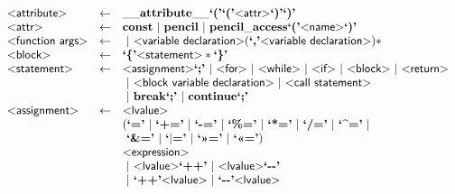 \begin{figure}
\[\begin{array}{lcl}
  \text{\sf\textless attribute\textgreater} & \gets & \mathbf{\_\_attribute\_\_} \text{\bf`('}\text{\bf`('} \text{\sf\textless attr\textgreater} \text{\bf`)'}\text{\bf`)'}\\

  \text{\sf\textless attr\textgreater} & \gets & \mathbf{const} 
                          ~|~ \mathbf{pencil} 
                          ~|~\mathbf{pencil\_access} \text{\bf`('} \text{\sf\textless name\textgreater} \text{\bf`)'}
\\

  \text{\sf\textless function args\textgreater} & \gets & ~|~ \text{\sf\textless variable declaration\textgreater} (\text{\bf`,'} \text{\sf\textless variable declaration\textgreater})*\\

  \text{\sf\textless block\textgreater} & \gets & \text{\bf`\{'} \text{\sf\textless statement\textgreater} * \text{\bf`\}'}\\

  \text{\sf\textless statement\textgreater} & \gets & \text{\sf\textless assignment\textgreater} \text{\bf`;'}
                               ~|~ \text{\sf\textless for\textgreater}
                               ~|~ \text{\sf\textless while\textgreater}
                               ~|~ \text{\sf\textless if\textgreater}
                               ~|~ \text{\sf\textless block\textgreater}
                               ~|~ \text{\sf\textless return\textgreater}\\ & &
                               ~|~ \text{\sf\textless block variable declaration\textgreater}
                               ~|~ \text{\sf\textless call statement\textgreater}\\ & &
                               ~|~ \mathbf{break} \text{\bf`;'}
                               ~|~ \mathbf{continue} \text{\bf`;'}
  \\

  \text{\sf\textless assignment\textgreater} & \gets & \text{\sf\textless lvalue\textgreater}\\&& (\text{\bf`='}
                                                        ~|~ \text{\bf`+='}
                                                        ~|~ \text{\bf`-='}
                                                        ~|~ \text{\bf`\%='}
                                                        ~|~ \text{\bf`*='}
                                                        ~|~ \text{\bf`/='}
                                                        ~|~ \text{\bf`\textasciicircum='} ~|~\\ &&
                                                            ~\text{\bf`\&='}
                                                        ~|~ \text{\bf`$|$='}
                                                        ~|~ \text{\bf`\textgreater\textgreater='}
                                                        ~|~ \text{\bf`\textless\textless='})\\&&
                                                         \text{\sf\textless expression\textgreater}\\ & &
                                                      ~|~ \text{\sf\textless lvalue\textgreater} \text{\bf`++'}
                                                      ~|~ \text{\sf\textless lvalue\textgreater} \text{\bf`{-}{-}'}\\&&
                                  ~|~\text{\bf`++'} \text{\sf\textless lvalue\textgreater}
                                  ~|~\text{\bf`{-}{-}'} \text{\sf\textless lvalue\textgreater}\\


\end{array}\]
\end{figure}
